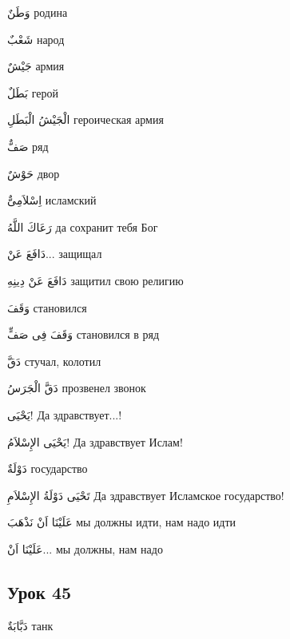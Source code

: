 \documentclass[a5paper]{article}
\newcommand\textstyleDropCaps[1]{#1}
\newcommand\textstyleCaptioncharacters[1]{#1}
\begin{document}
\textstyleCaptioncharacters{وَطَنٌ }\textstyleDropCaps{родина‎}

\textstyleCaptioncharacters{شَعْبٌ }\textstyleDropCaps{народ‎}

\textstyleCaptioncharacters{جَيْشٌ }\textstyleDropCaps{армия‎}

\textstyleCaptioncharacters{بَطَلٌ }\textstyleDropCaps{герой‎}

\textstyleCaptioncharacters{الْجَيْشُ الْبَطَلِ }\textstyleDropCaps{герои­ческая армия‎}

\textstyleCaptioncharacters{صَفٌّ }\textstyleDropCaps{ряд‎}

\textstyleCaptioncharacters{حَوْشٌ }\textstyleDropCaps{двор‎}

\textstyleCaptioncharacters{اِسْلاَمِىٌّ }\textstyleDropCaps{исламский‎}

\textstyleCaptioncharacters{رَعَاكَ اللَّهُ }\textstyleDropCaps{да сохранит тебя Бог‎}

\textstyleCaptioncharacters{دَافَعَ عَنْ...ِ }\textstyleDropCaps{защищал‎}

\textstyleCaptioncharacters{دَافَعَ عَنْ دِينِهِ }\textstyleDropCaps{защи­тил свою религию‎}

\textstyleCaptioncharacters{وَقَفَ }\textstyleDropCaps{становился‎}

\textstyleCaptioncharacters{وَقَفَ فِى صَفٍّ }\textstyleDropCaps{стано­вился в ряд‎}

\textstyleCaptioncharacters{دَقَّ }\textstyleDropCaps{стучал, колотил‎}

\textstyleCaptioncharacters{دَقَّ الْجَرَسُ }\textstyleDropCaps{прозвенел звонок‎}

\textstyleCaptioncharacters{يَحْيَى!ِ }\textstyleDropCaps{Да здравствует...!‎}

\textstyleCaptioncharacters{يَحْيَى الإِسْلاَمُ!ِ }\textstyleDropCaps{Да здравствует Ислам!‎}

\textstyleCaptioncharacters{دَوْلَةٌ }\textstyleDropCaps{государство‎}

\textstyleCaptioncharacters{تَحْيَى دَوْلَةُ الإِسْلاَمِ }\textstyleDropCaps{Да здравствует Исламское государство!‎}

\textstyleCaptioncharacters{عَلَيْنَا اَنْ نَذْهَبَ }\textstyleDropCaps{мы должны идти, нам надо идти‎}

\textstyleCaptioncharacters{عَلَيْنَا اَنْ...ِ }\textstyleDropCaps{мы должны, нам надо‎}

\subsection[Урок 45‎]{\textstyleDropCaps{Урок 45‎}}
\textstyleCaptioncharacters{دَبَّابَةٌ }\textstyleDropCaps{танк‎}
\end{document}
